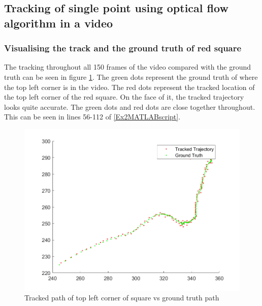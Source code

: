 \documentclass[11pt, letterpaper]{article}
\begin{document}
\subsection{Tracking of single point using optical flow algorithm in a video} 

\subsubsection*{Visualising the track and the ground truth of red square}
The tracking throughout all 150 frames of the video compared with the ground truth can be seen in figure \ref{fig:trackCorner}. The green dots represent the ground truth of where the top left corner is in the video. The red dots represent the tracked location of the top left corner of the red square. On the face of it, the tracked trajectory looks quite accurate. The green dots and red dots are close together throughout. This can be seen in lines 56-112 of \ref{Ex2MATLABscript}.

\begin{figure}[ht]
    \centering
    \includegraphics[width=0.75\linewidth]{Lab 2/trackCorner.png}
    \caption{Tracked path of top left corner of square vs ground truth path}
    \label{fig:trackCorner}
\end{figure}
\end{document}
